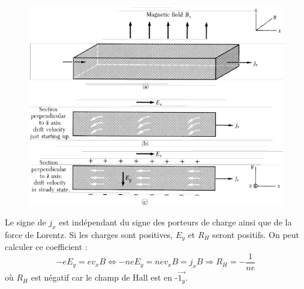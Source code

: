 	\begin{figure}
	\vspace{-1cm}
	\includegraphics[scale=0.25]{ch1/image2.png}
	\end{figure}
Le signe de $j_x$ est indépendant du signe des porteurs de charge ainsi que de la force
de Lorentz. Si les charges sont positives, $E_y$ et $R_H$ seront positifs. On peut 
calculer ce coefficient :
\begin{equation}
-eE_y = ev_xB \Leftrightarrow -neE_y = nev_xB = j_xB \Longrightarrow R_H = -\frac{1}{ne}
\end{equation}
où $R_H$ est négatif car le champ de Hall est en -$\vec{1_y}$.